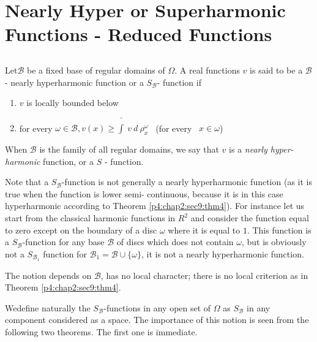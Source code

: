 \chapter[Nearly Hyper or Superharmonic Functions...]{Nearly Hyper or Superharmonic Functions - Reduced
  Functions}\label{p4:chap3} 

\setcounter{section}{10}
\section{}\label{p4:chap3:sec11} %

\begin{defn}\label{p4:chap3:sec11:def7} %
  Let\pageoriginale $\mathscr{B}$ be a fixed base of regular domains of $\Omega$. A
  real functions $v$ is said to be a $\mathscr{B}$- nearly
  hyperharmonic function or a $S_\mathscr{B}$- function if  
  \begin{enumerate}[\rm (i)]
  \item $v$ is locally  bounded below
  \item for every $\omega \in \mathscr{B}, v(x) \ge \bar{\int} ~ v ~ d
    ~ \rho^\omega_x$ ~(for every ~$x \in \omega$) 
  \end{enumerate}
\end{defn}

When $\mathscr{B}$ is the family of all regular domains, we say that
$v$ is a \textit{nearly hyper-harmonic} function, or a $S$ -
function. 

Note that a $S_\mathscr{B}$-function is not generally a nearly
hyperharmonic function (as it is true when the function is lower semi-
continuous, because it is in this case hyperharmonic according to
Theorem \ref{p4:chap2:sec9:thm4}). For instance let us start from the
classical harmonic 
functions in $R^2$ and consider the function equal to zero except on
the boundary of a disc $\omega$ where it is equal to $1$. This
function is a $S_\mathscr{B}$-function for any base $\mathscr{B}$ of
discs which does not contain $\omega$, but is obviously not a
$S_{\mathscr{B}_1}$ function for $\mathscr{B}_1 = \mathscr{B} \cup \{
\omega\}$, it is not a nearly hyperharmonic function. 

The notion depends on $\mathscr{B}$, has no local character; there is
no local criterion as in Theorem \ref{p4:chap2:sec9:thm4}. 

We\pageoriginale define naturally the $S_\mathscr{B}$-functions in any open set of
$\Omega$ as $S_\mathscr{B}$ in any component considered as a
space. The importance of this notion is seen from the following two
theorems. The first one is immediate. 

